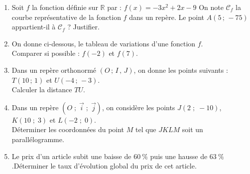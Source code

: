 \documentclass[a4paper,11pt]{article}
\begin{document}
\begin{seance}{} %

\begin{enumerate}
\item  Soit $f$ la fonction définie sur $\mathbb{R}$ par  : $f(x)=-3x^2+2x-9$
              On note $\mathscr{C}_f$ la courbe représentative de la fonction $f$ dans un repère.
              Le point $A(5\,;\, -75)$ appartient-il à $\mathscr{C}_f$ ? Justifier. 

\bigskip

\dotfill

\item On donne ci-dessous, le tableau de variations d'une fonction $f$. \\
 Comparer si possible : $f(-2)$ et $f(7)$.

\medskip
\begin{center}
\end{center}


\item   Dans un repère orthonormé $(O\,;\,I\,,\,J)$, on donne les points suivants : $T\left(10\,;\,1\right)$ et $U\left(-4\,;\,-3\right)$. \\Calculer la distance $TU$.

\bigskip

\dotfill

\bigskip

\dotfill

\item  Dans un repère $(O\;;\;\vec{i}\;;\;\vec{j})$, on considère les points $J(2\;;\;-10)$, $K(10\;;\;3)$ et $L(-2\;;\;0)$.\\Déterminer les coordonnées du point $M$ tel que $JKLM$ soit un parallélogramme.\dotfill

\bigskip

\dotfill

\bigskip

\dotfill


\item  Le prix d'un article subit une baisse de $60~\%$ puis une hausse de $63~\%$.Déterminer le taux d'évolution global du prix de cet article. 

\bigskip

\dotfill



\end{enumerate}

\end{seance}
\end{document}
